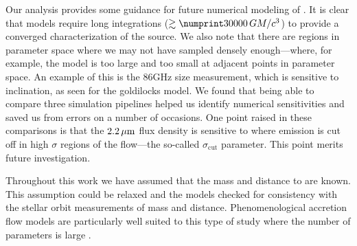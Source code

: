 Our analysis provides some guidance for future numerical modeling of \sgra.
It is clear that models require long integrations ($\gtrsim \no{30000}\,\tg$) to provide a converged characterization of the source.
We also note that there are regions in parameter space where we may not have sampled densely enough---where, for example, the model is too large and too small at adjacent points in parameter space.
An example of this is the 86GHz size measurement, which is sensitive to inclination, as seen for the goldilocks model.
We found that being able to compare three simulation pipelines helped us identify numerical sensitivities and saved us from errors on a number of occasions.
One point raised in these comparisons is that the $2.2\,\mu\mathrm{m}$ flux density is sensitive to where emission is cut off in high $\sigma$ regions of the flow---the so-called $\sigma_\mathrm{cut}$ parameter.
This point merits future investigation.

Throughout this work we have assumed that the mass and distance to \sgra are known.
This assumption could be relaxed and the models checked for consistency with the stellar orbit measurements of mass and distance.
Phenomenological accretion flow models are particularly well suited to this type of study where the number of parameters is large  \citep[e.g.,]{2009ApJ...697...45B}.
